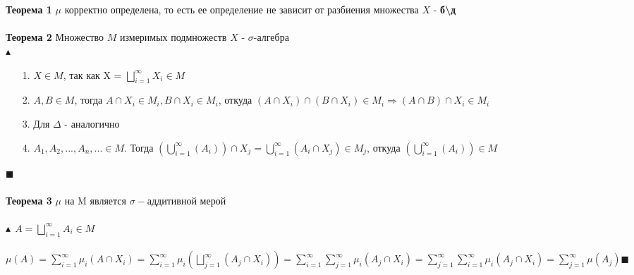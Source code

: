 \\
\\
\textbf{Теорема 1} $\mu$ корректно определена, то есть ее определение не зависит от разбиения множества $X$ - \textbf{б\textbackslash д}
\\
\\
\textbf{Теорема 2} Множество $M$ измеримых подмножеств $X$ - $\sigma$-алгебра
\\
$\blacktriangle$
\begin{itemize}
    \item [1.] $X \in M$, так как  X = $\bigsqcup_{i=1}^{\infty} X_i \in M$
     \item [2.] $A, B \in M$, тогда $A \cap X_i \in M_i, B \cap X_i \in M_i$, откуда  $(A \cap X_i) \cap (B \cap X_i) \in M_i \Longrightarrow (A \cap B) \cap X_i \in M_i$
     \item [3.] Для  $\Delta$ - аналогично
     \item [4.] $A_1, A_2,..., A_n, ... \in M$. Тогда $(\bigcup_{i=1}^{\infty} (A_i)) \cap X_j = \bigcup_{i=1}^{\infty} (A_i \cap X_j) \in M_j$, откуда $(\bigcup_{i=1}^{\infty} (A_i)) \in M$ 
\end{itemize}
$\blacksquare$
\\
\\
\textbf{Теорема 3} $\mu$ на M является $\sigma-$аддитивной мерой
\\
\\
$\blacktriangle \ \ A = \bigsqcup_{i=1}^{\infty} A_i \in M$ \\ \\
$\mu(A) = \sum\limits_{i=1}^{\infty} \mu_i(A \cap X_i) = \sum\limits_{i=1}^{\infty} \mu_i (\bigsqcup_{j=1}^{\infty} (A_j \cap X_i)) = \sum\limits_{i=1}^{\infty}\sum\limits_{j=1}^{\infty} \mu_i(A_j \cap X_i) = \sum\limits_{j=1}^{\infty}\sum\limits_{i=1}^{\infty} \mu_i(A_j \cap X_i) = \sum\limits_{j=1}^{\infty}\mu(A_j) \blacksquare$
